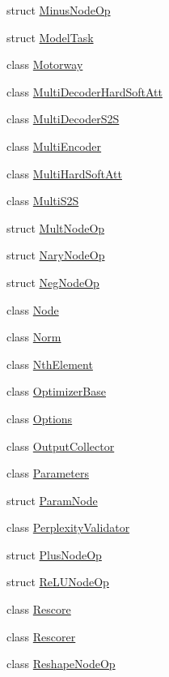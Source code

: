 \begin{DoxyCompactItemize}
struct \hyperlink{structmarian_1_1MinusNodeOp}{Minus\+Node\+Op}
\item 
struct \hyperlink{structmarian_1_1ModelTask}{Model\+Task}
\item 
class \hyperlink{classmarian_1_1Motorway}{Motorway}
\item 
class \hyperlink{classmarian_1_1MultiDecoderHardSoftAtt}{Multi\+Decoder\+Hard\+Soft\+Att}
\item 
class \hyperlink{classmarian_1_1MultiDecoderS2S}{Multi\+Decoder\+S2S}
\item 
class \hyperlink{classmarian_1_1MultiEncoder}{Multi\+Encoder}
\item 
class \hyperlink{classmarian_1_1MultiHardSoftAtt}{Multi\+Hard\+Soft\+Att}
\item 
class \hyperlink{classmarian_1_1MultiS2S}{Multi\+S2S}
\item 
struct \hyperlink{structmarian_1_1MultNodeOp}{Mult\+Node\+Op}
\item 
struct \hyperlink{structmarian_1_1NaryNodeOp}{Nary\+Node\+Op}
\item 
struct \hyperlink{structmarian_1_1NegNodeOp}{Neg\+Node\+Op}
\item 
class \hyperlink{classmarian_1_1Node}{Node}
\item 
class \hyperlink{classmarian_1_1Norm}{Norm}
\item 
class \hyperlink{classmarian_1_1NthElement}{Nth\+Element}
\item 
class \hyperlink{classmarian_1_1OptimizerBase}{Optimizer\+Base}
\item 
class \hyperlink{classmarian_1_1Options}{Options}
\item 
class \hyperlink{classmarian_1_1OutputCollector}{Output\+Collector}
\item 
class \hyperlink{classmarian_1_1Parameters}{Parameters}
\item 
struct \hyperlink{structmarian_1_1ParamNode}{Param\+Node}
\item 
class \hyperlink{classmarian_1_1PerplexityValidator}{Perplexity\+Validator}
\item 
struct \hyperlink{structmarian_1_1PlusNodeOp}{Plus\+Node\+Op}
\item 
struct \hyperlink{structmarian_1_1ReLUNodeOp}{Re\+L\+U\+Node\+Op}
\item 
class \hyperlink{classmarian_1_1Rescore}{Rescore}
\item 
class \hyperlink{classmarian_1_1Rescorer}{Rescorer}
\item 
class \hyperlink{classmarian_1_1ReshapeNodeOp}{Reshape\+Node\+Op}

\end{DoxyCompactItemize}
